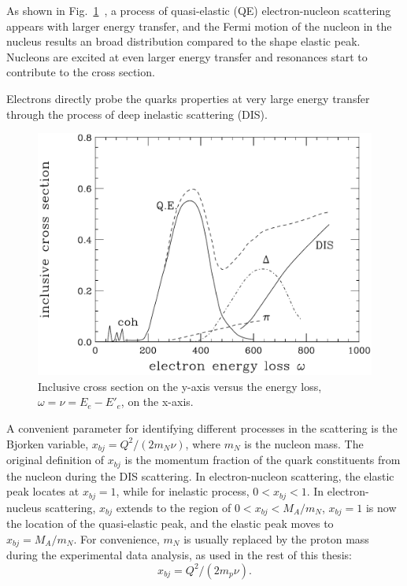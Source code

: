 As shown in Fig.~\ref{e_trans}~\cite{qe_donal}, a process of quasi-elastic (QE) electron-nucleon scattering appears with larger energy transfer, and the Fermi motion of the nucleon in the nucleus results an broad distribution compared to the shape elastic peak. Nucleons are excited at even larger energy transfer and resonances start to contribute to the cross section. 

Electrons directly probe the quarks properties at very large energy transfer through the process of deep inelastic scattering (DIS). 
\begin{figure}[!ht]
  \begin{center}
    \includegraphics[type=pdf,ext=.pdf,read=.pdf,width=0.60\linewidth]{./figures/physics/eesm}
    \caption[Electron energy transfer]{\footnotesize{Inclusive cross section on the y-axis versus the energy loss,$\omega=\nu=E_{e}-E'_{e}$, on the x-axis.}}
    \label{e_trans}
  \end{center}
\end{figure}

A convenient parameter for identifying different processes in the scattering is the Bjorken variable, $x_{bj}=Q^{2}/(2m_{N}\nu)$, where $m_{N}$ is the nucleon mass. The original definition of $x_{bj}$ is the momentum fraction of the quark constituents from the nucleon during the DIS scattering. In electron-nucleon scattering, the elastic peak locates at $x_{bj}=1$, while for inelastic process, $0<x_{bj}<1$. In electron-nucleus scattering, $x_{bj}$ extends to the region of $0<x_{bj}<M_{A}/m_{N}$, $x_{bj}=1$ is now the location of the quasi-elastic peak, and the elastic peak moves to $x_{bj}=M_{A}/m_{N}$. For convenience, $m_{N}$ is usually replaced by the proton mass during the experimental data analysis, as used in the rest of this thesis:
\begin{equation}
  x_{bj} = Q^{2}/(2m_{p}\nu).
  \label{xbj_define}
\end{equation}  

